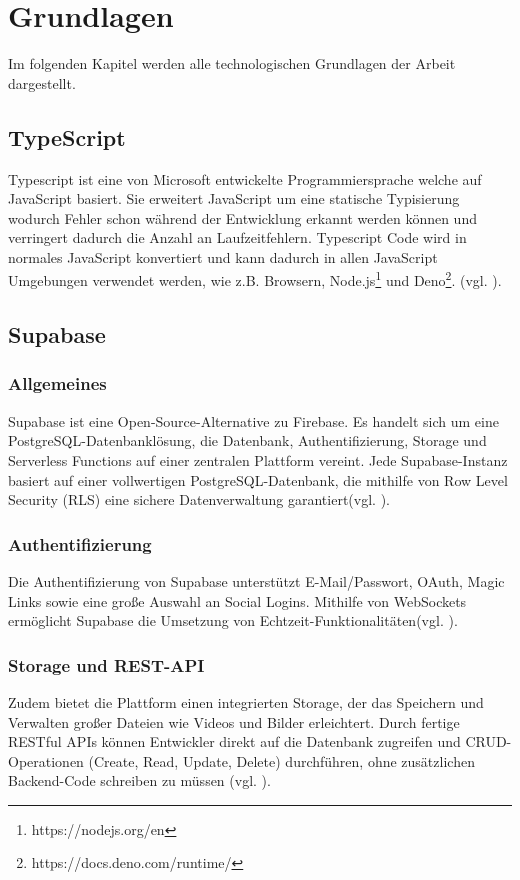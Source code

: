 \documentclass[oneside]{ausarbeitung}
\begin{document}
\chapter{Grundlagen}
\label{chap:grundlagen}

Im folgenden Kapitel werden alle technologischen Grundlagen der Arbeit dargestellt.
 
\section{TypeScript}
Typescript ist eine von Microsoft entwickelte Programmiersprache welche auf JavaScript basiert. Sie erweitert JavaScript um eine statische Typisierung wodurch Fehler schon während der Entwicklung erkannt werden können und verringert dadurch die Anzahl an Laufzeitfehlern. Typescript Code wird in normales JavaScript konvertiert und kann dadurch in allen JavaScript Umgebungen verwendet werden, wie z.B. Browsern, Node.js\footnote{https://nodejs.org/en} und Deno\footnote{https://docs.deno.com/runtime/}.
(vgl. \parencite{typescript}). 

\section{Supabase}
\subsection{Allgemeines}
Supabase ist eine Open-Source-Alternative zu Firebase. Es handelt sich um eine PostgreSQL-Datenbanklösung, die Datenbank, Authentifizierung, Storage und Serverless Functions auf einer zentralen Plattform vereint. Jede Supabase-Instanz basiert auf einer vollwertigen PostgreSQL-Datenbank, die mithilfe von Row Level Security (RLS) eine sichere Datenverwaltung garantiert(vgl. \parencite{supabase}).

\subsection{Authentifizierung}
Die Authentifizierung von Supabase unterstützt E-Mail/Passwort, OAuth, Magic Links sowie eine große Auswahl an Social Logins. Mithilfe von WebSockets ermöglicht Supabase die Umsetzung von Echtzeit-Funktionalitäten(vgl. \parencite{supabase}).

\subsection{Storage und REST-API}
Zudem bietet die Plattform einen integrierten Storage, der das Speichern und Verwalten großer Dateien wie Videos und Bilder erleichtert. Durch fertige RESTful APIs können Entwickler direkt auf die Datenbank zugreifen und CRUD-Operationen (Create, Read, Update, Delete) durchführen, ohne zusätzlichen Backend-Code schreiben zu müssen (vgl. \parencite{supabase}). 
\end{document}
